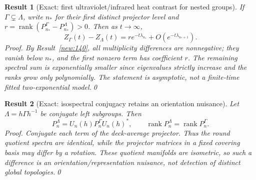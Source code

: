 \documentclass[aps,prd,onecolumn,notitlepage,groupedaddress,11pt]{revtex4-2}
\newtheorem{result}{Result}
\begin{document}
\begin{result}[\textsf{Exact}: first ultraviolet/infrared heat contrast for nested groups]\label{new:145}
If \(\Gamma\subsetneq\Lambda\), write \(n_*\) for their first distinct projector level and \(r=\operatorname{rank}(P_{n_*}^\Gamma-P_{n_*}^\Lambda)>0\). Then as \(t\to\infty\),
\begin{equation}\label{new:eq145}
Z_\Gamma(t)-Z_\Lambda(t)=r e^{-t\lambda_{n_*}}+O\!\left(e^{-t\lambda_{n_*+1}}\right).
\end{equation}
\textit{Proof.} By Result~\ref{new:140}, all multiplicity differences are nonnegative; they vanish below \(n_*\), and the first nonzero term has coefficient \(r\). The remaining spectral sum is exponentially smaller since eigenvalues strictly increase and the ranks grow only polynomially. The statement is asymptotic, not a finite-time fitted two-exponential model.\qed
\end{result}
\begin{result}[\textsf{Exact}: isospectral conjugacy retains an orientation nuisance]\label{new:146}
Let \(\Lambda=h\Gamma h^{-1}\) be conjugate left subgroups. Then
\begin{equation}\label{new:eq146}
P_n^\Lambda=U_n(h)P_n^\Gamma U_n(h)^*,\qquad
\operatorname{rank}P_n^\Lambda=\operatorname{rank}P_n^\Gamma.
\end{equation}
\textit{Proof.} Conjugate each term of the deck-average projector. Thus the round quotient spectra are identical, while the projector matrices in a fixed covering basis may differ by a rotation. These quotient manifolds are isometric, so such a difference is an \emph{orientation/representation nuisance}, not detection of distinct global topologies.\qed
\end{result}
\end{document}
